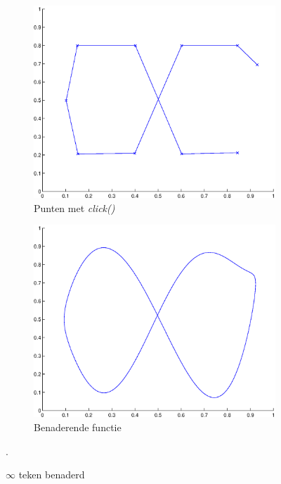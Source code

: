 \documentclass[a4paper]{article}
\begin{document}
\begin{figure}
    \centering
    \begin{subfigure}[b]{0.4\textwidth}
        \centering
        \includegraphics[width=\textwidth]{infclick.eps}
        \caption{Punten met \textit{click()}}
        \label{fig:periotriga}
    \end{subfigure}
    \begin{subfigure}[b]{0.4\textwidth}
        \centering
        \includegraphics[width=\textwidth]{inftrig.eps}
        \caption{Benaderende functie}
        \label{fig:periotrigb}
    \end{subfigure}
    \hfill
    \caption{$\infty$ teken benaderd}\label{fig:periotrigclick}.
\end{figure}
\end{document}
